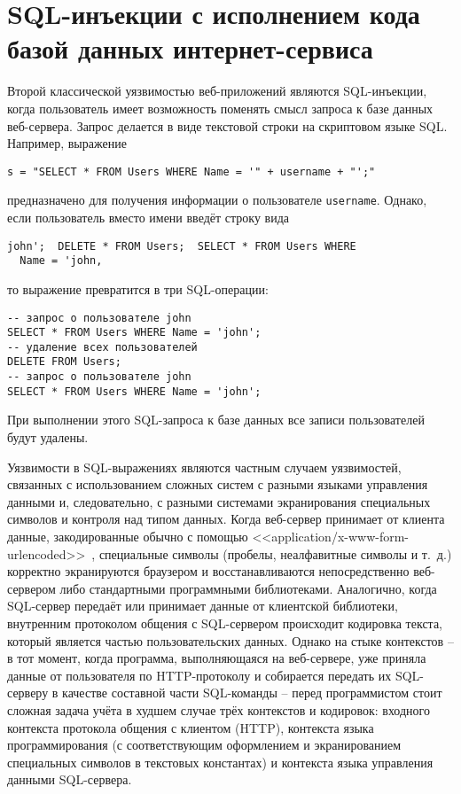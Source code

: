 \section[SQL-инъекции с исполнением кода веб-сервером]{SQL-инъекции с исполнением кода \protect\\ базой данных интернет-сервиса}

Второй классической уязвимостью веб-приложений являются SQL-инъекции, когда пользователь имеет возможность поменять смысл запроса к базе данных веб-сервера. Запрос делается в виде текстовой строки на скриптовом языке SQL. Например, выражение
\begin{verbatim}
s = "SELECT * FROM Users WHERE Name = '" + username + "';"
\end{verbatim}
предназначено для получения информации о пользователе \texttt{username}. Однако, если пользователь вместо имени введёт строку вида
\begin{center} \begin{verbatim}
john';  DELETE * FROM Users;  SELECT * FROM Users WHERE
  Name = 'john,
\end{verbatim} \end{center}
то выражение превратится в три SQL-операции:
\begin{verbatim}
-- запрос о пользователе john
SELECT * FROM Users WHERE Name = 'john';
-- удаление всех пользователей
DELETE FROM Users;
-- запрос о пользователе john
SELECT * FROM Users WHERE Name = 'john';
\end{verbatim}
При выполнении этого SQL-запроса к базе данных все записи пользователей будут удалены.

Уязвимости в SQL-выражениях являются частным случаем уязвимостей, связанных с использованием сложных систем с разными языками управления данными и, следовательно, с разными системами экранирования специальных символов и контроля над типом данных. Когда веб-сервер принимает от клиента данные, закодированные обычно с помощью <<application/x-www-form-urlencoded>>~\cite{html4:1999}, специальные символы (пробелы, неалфавитные символы и т.~д.) корректно экранируются браузером и восстанавливаются непосредственно веб-сервером либо стандартными программными библиотеками. Аналогично, когда SQL-сервер передаёт или принимает данные от клиентской библиотеки, внутренним протоколом общения с SQL-сервером происходит кодировка текста, который является частью пользовательских данных. Однако на стыке контекстов -- в тот момент, когда программа, выполняющаяся на веб-сервере, уже приняла данные от пользователя по HTTP-протоколу и собирается передать их SQL-серверу в качестве составной части SQL-команды -- перед программистом стоит сложная задача учёта в худшем случае трёх контекстов и кодировок: входного контекста протокола общения с клиентом (HTTP), контекста языка программирования (с соответствующим оформлением и экранированием специальных символов в текстовых константах) и контекста языка управления данными SQL-сервера.

